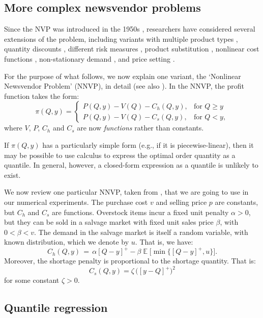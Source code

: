 \documentclass{article}
\DeclareMathOperator{\E}{\mathbb{E}}
\begin{document}
\subsection{More complex newsvendor problems} %

Since the NVP was introduced in the 1950s \cite{AHM51,MK51}, researchers have considered several extensions of the problem, including variants with multiple product types \cite{HW63,LL96,MS00}, quantity discounts \cite{Kh95}, different risk measures \cite{EGS95}, product substitution \cite{BAA99}, nonlinear cost functions \cite{HOS12}, non-stationary demand \cite{KWH15}, and price setting \cite{KC62,Mi59,PD99}.

For the purpose of what follows, we now explain one variant, the `Nonlinear Newsvendor Problem' (NNVP), in detail (see also \cite{BT06,HOS12,HN16,KC62,Kh95,KK18,Mi59,PSC15,PD99}). In the NNVP, the profit function takes the form:
\[
    \pi(Q,y)=
    \begin{cases}
        P(Q,y)-V(Q)-C_h(Q,y),& \text{for } Q \geq y\\
        P(Q,y)-V(Q)-C_s(Q,y),& \text{for } Q< y,
    \end{cases}
\]
where $V$, $P$, $C_h$ and $C_s$ are now \emph{functions} rather than constants.

If $\pi(Q,y)$ has a particularly simple form (e.g., if it is piecewise-linear), then it may be possible to  use calculus to express the optimal order quantity as a quantile. In general, however, a closed-form expression as a quantile is unlikely to exist.

We now review one particular NNVP, taken from \cite{KK18,PD99,RK02}, that we are going to use in our numerical experiments. The purchase cost $v$ and selling price $p$ are constants, but $C_h$ and $C_s$ are functions. Overstock items incur a fixed unit penalty $\alpha > 0$, but they can be sold in a salvage market with fixed unit sales price $\beta$, with $0<\beta<v$. The demand in the salvage market is itself a random variable, with known distribution, which we denote by $u$. That is, we have:
\[
    C_h(Q,y) \, = \, \alpha[Q-y]^{+} - \beta \E \Big[ \min \big\{ [Q-y]^{+},u \big\} \Big].
\]
Moreover, the shortage penalty is proportional to the shortage quantity. That is:
\[
C_s(Q,y) =  \zeta \, \big( [y-Q]^{+} \big)^2
\]
for some constant $\zeta > 0$.

\subsection{Quantile regression} %
\end{document}
